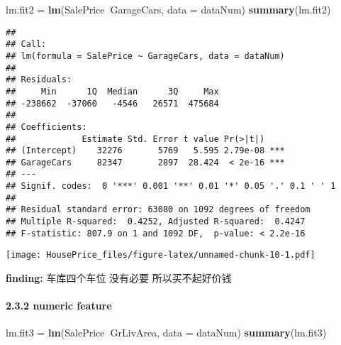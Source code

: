 \documentclass[]{article}
\newenvironment{Shaded}{\begin{snugshade}}{\end{snugshade}}
\newcommand{\KeywordTok}[1]{\textcolor[rgb]{0.13,0.29,0.53}{\textbf{#1}}}
\newcommand{\DataTypeTok}[1]{\textcolor[rgb]{0.13,0.29,0.53}{#1}}
\newcommand{\DecValTok}[1]{\textcolor[rgb]{0.00,0.00,0.81}{#1}}
\newcommand{\StringTok}[1]{\textcolor[rgb]{0.31,0.60,0.02}{#1}}
\newcommand{\OperatorTok}[1]{\textcolor[rgb]{0.81,0.36,0.00}{\textbf{#1}}}
\newcommand{\NormalTok}[1]{#1}
\let\oldparagraph\paragraph
\renewcommand{\paragraph}[1]{\oldparagraph{#1}\mbox{}}
\begin{document}
\begin{Shaded}
\begin{Highlighting}[]
\NormalTok{lm.fit2 =}\StringTok{ }\KeywordTok{lm}\NormalTok{(SalePrice}\OperatorTok{~}\NormalTok{GarageCars, }\DataTypeTok{data =}\NormalTok{ dataNum)}
\KeywordTok{summary}\NormalTok{(lm.fit2) }
\end{Highlighting}
\end{Shaded}

\begin{verbatim}
## 
## Call:
## lm(formula = SalePrice ~ GarageCars, data = dataNum)
## 
## Residuals:
##     Min      1Q  Median      3Q     Max 
## -238662  -37060   -4546   26571  475684 
## 
## Coefficients:
##             Estimate Std. Error t value Pr(>|t|)    
## (Intercept)    32276       5769   5.595 2.79e-08 ***
## GarageCars     82347       2897  28.424  < 2e-16 ***
## ---
## Signif. codes:  0 '***' 0.001 '**' 0.01 '*' 0.05 '.' 0.1 ' ' 1
## 
## Residual standard error: 63080 on 1092 degrees of freedom
## Multiple R-squared:  0.4252, Adjusted R-squared:  0.4247 
## F-statistic: 807.9 on 1 and 1092 DF,  p-value: < 2.2e-16
\end{verbatim}

\begin{Shaded}
\end{Shaded}

\texttt{[image: HousePrice\_files/figure-latex/unnamed-chunk-10-1.pdf]}

\textbf{finding:} 车库四个车位 没有必要 所以买不起好价钱

\paragraph{2.3.2 numeric feature}\label{numeric-feature}

\begin{Shaded}
\begin{Highlighting}[]
\NormalTok{lm.fit3 =}\StringTok{ }\KeywordTok{lm}\NormalTok{(SalePrice}\OperatorTok{~}\NormalTok{GrLivArea, }\DataTypeTok{data =}\NormalTok{ dataNum)}
\KeywordTok{summary}\NormalTok{(lm.fit3) }
\end{Highlighting}
\end{Shaded}
\end{document}
